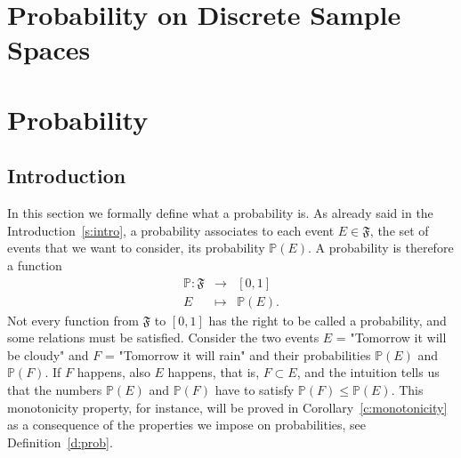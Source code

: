 
\section{ Probability on Discrete Sample Spaces}

  


\section{Probability}
\label{s:probability}

	\subsection{Introduction}

	In this section we formally define what a probability is. As already said in the Introduction~\ref{s:intro}, a probability associates to each event $E \in \mathfrak F$, the set of events that we want to consider, its probability $\mathbb P(E)$. A probability is therefore a function 
	\begin{equation}
		\label{e:prob_def}
		\begin{array}{ccc}
			\mathbb P: \mathfrak F & \to & [0,1]\\
			E & \mapsto & \mathbb P(E).
		\end{array}
	\end{equation}
	Not every function from $\mathfrak F$ to $[0,1]$ has the right to be called a probability, and some relations must be satisfied. Consider the two events $E$ = "Tomorrow it will be cloudy" and $F$ = "Tomorrow it will rain" and their probabilities $\mathbb P(E)$ and $\mathbb P(F)$. If $F$ happens, also $E$ happens, that is, $F \subset E$, and the intuition tells us that the numbers $\mathbb P(E)$ and $\mathbb P(F)$ have to satisfy $\mathbb P(F) \leq \mathbb P(E)$. This monotonicity property, for instance, will be proved in Corollary~\ref{c:monotonicity} as a consequence of the properties we impose on probabilities, see Definition~\ref{d:prob}. 

